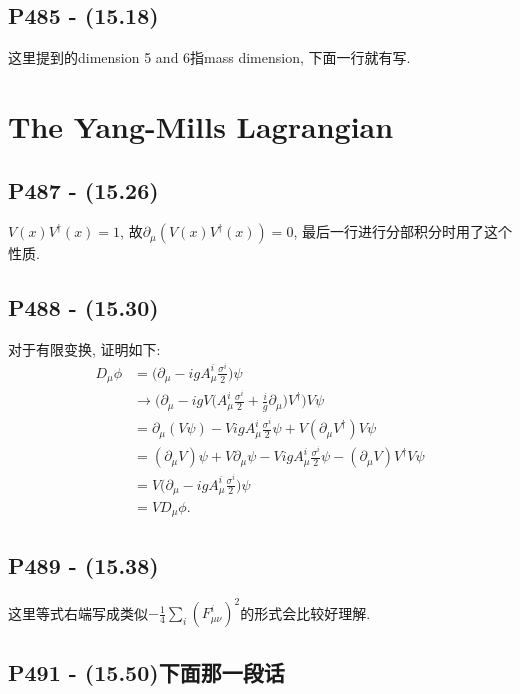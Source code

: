 \documentclass[10pt,b5paper,openany]{book}
\begin{document}
\subsection{P485 - (15.18)}

这里提到的dimension 5 and 6指mass dimension, 下面一行就有写. 

\section{The Yang-Mills Lagrangian}

\subsection{P487 - (15.26)}

$V(x)V^{\dagger}(x) = 1$, 故$\partial_{\mu}(V(x)V^{\dagger}(x))=0$, 最后一行进行分部积分时用了这个性质. 

\subsection{P488 - (15.30)}

对于有限变换, 证明如下: 
\begin{equation}
  \begin{aligned}
    D_{\mu}\phi &= \biggl(\partial_{\mu} - igA^{i}_{\mu}\frac{\sigma^i}{2}\biggr)\psi \\
    &\rightarrow \biggl(\partial_{\mu} - igV\biggl(A^{i}_{\mu}\frac{\sigma^i}{2} + \frac{i}{g}\partial_{\mu}\biggr)V^{\dagger}\biggr)V\psi \\ 
    &= \partial_{\mu}(V\psi) - VigA^{i}_{\mu}\frac{\sigma^i}{2}\psi + V(\partial_{\mu}V^{\dagger})V\psi \\ 
    &= (\partial_{\mu}V)\psi + V\partial_{\mu}\psi - VigA^{i}_{\mu}\frac{\sigma^i}{2}\psi - (\partial_{\mu}V)V^{\dagger}V\psi \\ 
    &= V\biggl(\partial_{\mu} - igA^{i}_{\mu}\frac{\sigma^i}{2}\biggr)\psi \\ 
    &= VD_{\mu}\phi.
  \end{aligned}
\end{equation}

\subsection{P489 - (15.38)}

这里等式右端写成类似$-\frac{1}{4}\sum_{i}(F^i_{\mu\nu})^2$的形式会比较好理解. 

\subsection{P491 - (15.50)下面那一段话}
\end{document}
